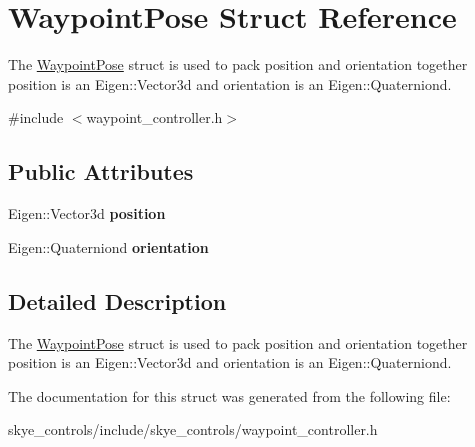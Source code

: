 \hypertarget{struct_waypoint_pose}{\section{Waypoint\-Pose Struct Reference}
\label{struct_waypoint_pose}
}


The \hyperlink{struct_waypoint_pose}{Waypoint\-Pose} struct is used to pack position and orientation together position is an Eigen\-::\-Vector3d and orientation is an Eigen\-::\-Quaterniond.  




{\ttfamily \#include $<$waypoint\-\_\-controller.\-h$>$}

\subsection*{Public Attributes}
\begin{DoxyCompactItemize}
\item 
\hypertarget{struct_waypoint_pose_a4c14b1d687197e91103b42de17f7234a}{Eigen\-::\-Vector3d {\bfseries position}}\label{struct_waypoint_pose_a4c14b1d687197e91103b42de17f7234a}

\item 
\hypertarget{struct_waypoint_pose_add7868caf7e885948e09b95a71dc3e58}{Eigen\-::\-Quaterniond {\bfseries orientation}}\label{struct_waypoint_pose_add7868caf7e885948e09b95a71dc3e58}

\end{DoxyCompactItemize}


\subsection{Detailed Description}
The \hyperlink{struct_waypoint_pose}{Waypoint\-Pose} struct is used to pack position and orientation together position is an Eigen\-::\-Vector3d and orientation is an Eigen\-::\-Quaterniond. 

The documentation for this struct was generated from the following file\-:\begin{DoxyCompactItemize}
\item 
skye\-\_\-controls/include/skye\-\_\-controls/waypoint\-\_\-controller.\-h\end{DoxyCompactItemize}
